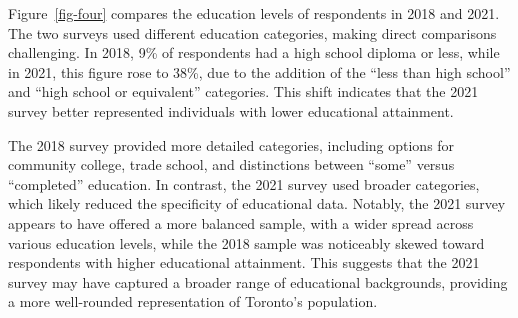 \documentclass[
  letterpaper,
  DIV=11,
  numbers=noendperiod]{scrartcl}
\begin{document}
Figure~\ref{fig-four} compares the education levels of respondents in
2018 and 2021. The two surveys used different education categories,
making direct comparisons challenging. In 2018, 9\% of respondents had a
high school diploma or less, while in 2021, this figure rose to 38\%,
due to the addition of the ``less than high school'' and ``high school
or equivalent'' categories. This shift indicates that the 2021 survey
better represented individuals with lower educational attainment.

The 2018 survey provided more detailed categories, including options for
community college, trade school, and distinctions between ``some''
versus ``completed'' education. In contrast, the 2021 survey used
broader categories, which likely reduced the specificity of educational
data. Notably, the 2021 survey appears to have offered a more balanced
sample, with a wider spread across various education levels, while the
2018 sample was noticeably skewed toward respondents with higher
educational attainment. This suggests that the 2021 survey may have
captured a broader range of educational backgrounds, providing a more
well-rounded representation of Toronto's population.
\end{document}
